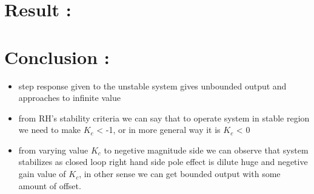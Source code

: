\message{ !name(lab1.tex)}\documentclass[a4paper,12pt,openany]{book}
\begin{document}
\section{Result : }

\begin{table}[H]
\centering
{}
\caption{step response with varying $K_c$ value}
\label{tab:my-table}
\end{table}





\section{Conclusion : }
\begin{itemize}
  \item step response given to the unstable system gives unbounded output and
    approaches to infinite value
\item from RH's stability criteria we can say that to operate system in stable
  region we need to make $K_c$ < -1, or in more general way it is $K_c$ < 0
\item from varying value $K_c$ to negetive magnitude side we can observe that
  system stabilizes as closed loop right hand side pole effect is dilute huge and
  negetive gain value of $K_c$, in other sense we can get bounded output with
 some amount of offset.  
\end{itemize}
\end{document}
